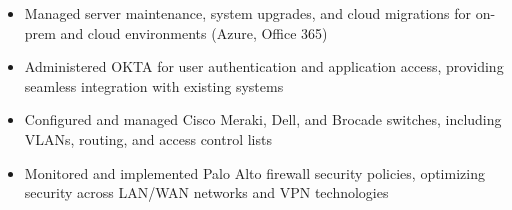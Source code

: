 \par\bigskip
{}
\par\smallskip
\begin{minipage}{13.75cm}
  \begin{minipage}{6.5cm}
    \begin{itemize}
      \item Managed server maintenance, system upgrades, and cloud migrations for on-prem and cloud environments (Azure, Office 365)
      \item Administered OKTA for user authentication and application access, providing seamless integration with existing systems
    \end{itemize}
  \end{minipage}
  \hfill
  \begin{minipage}{6.5cm}
    \begin{itemize}
      \item Configured and managed Cisco Meraki, Dell, and Brocade switches, including VLANs, routing, and access control lists
      \item Monitored and implemented Palo Alto firewall security policies, optimizing security across LAN/WAN networks and VPN technologies
    \end{itemize}
  \end{minipage}
\end{minipage}
\par\smallskip
\divider

